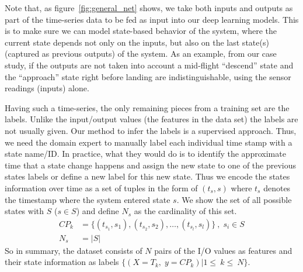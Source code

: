 Note that, as figure~\ref{fig:general_net} shows, we take both inputs and outputs as part of the time-series data to be fed as input into our deep learning models. This is to make sure we can model state-based behavior of the system, where the current state depends not only on the inputs, but also on the last state(s) (captured as previous outputs) of the system. As an example, from our case study, if the outputs are not taken into account 
a mid-flight ``descend'' state and the ``approach'' state right before landing
are indistinguishable, using the sensor readings (inputs) alone. 

Having such a time-series, the only remaining pieces from a training set are the labels. Unlike the input/output values (the features in the data set) the labels are not usually given. Our method to infer the labels is a supervised approach. Thus, we need the domain expert to manually label each individual time stamp with a state name/ID. In practice, what they would do is to identify the approximate time that a state change happens and assign the new state to one of the previous states labels or define a new label for this new state.
Thus we encode the states information over time as a set of tuples in the form of $(t_s, s)$ where $t_s$ denotes the timestamp where the system entered state $s$. We show the set of all possible states with $S$ ($s \in S$) and define $N_s$ as the cardinality of this set. 
\begin{equation}\label{eq:change_point}\begin{split}
    CP_k {}&{}= \big\{ (t_{s_1}, s_1), (t_{s_2}, s_2), \ldots, (t_{s_l}, s_l) \big\}\:,\; s_i \in S \\
    N_s  {}&{}= |S|
\end{split}
\end{equation}
So in summary, the dataset consists of $N$ pairs of the I/O values as features and their state information as labels $\big\{(X=T_k,\;y=CP_k)|1\leq~k\leq~N\big\}$. 

